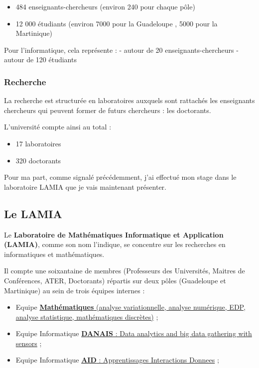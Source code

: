 \begin{itemize}
\tightlist
\item
  484 enseignants-chercheurs (environ 240 pour chaque pôle)
\item
  12 000 étudiants (environ 7000 pour la Guadeloupe , 5000 pour la
  Martinique)
\end{itemize}

Pour l'informatique, cela représente : - autour de 20
enseignants-chercheurs - autour de 120 étudiants

\hypertarget{recherche}{%
\subsubsection{Recherche}\label{recherche}}

La recherche est structurée en laboratoires auxquels sont rattachés les
enseignants chercheurs qui peuvent former de futurs chercheurs : les
doctorants.

L'université compte ainsi au total :

\begin{itemize}
\tightlist
\item
  17 laboratoires
\item
  320 doctorants
\end{itemize}

Pour ma part, comme signalé précédemment, j'ai effectué mon stage dans
le laboratoire LAMIA que je vais maintenant présenter.

\hypertarget{le-lamia}{%
\subsection{Le LAMIA}\label{le-lamia}}

Le \textbf{Laboratoire de Mathématiques Informatique et Application
(LAMIA)}, comme son nom l'indique, se concentre sur les recherches en
informatiques et mathématiques.

Il compte une soixantaine de membres (Professeurs des Universités,
Maitres de Conférences, ATER, Doctorants) répartis sur deux pôles
(Guadeloupe et Martinique) au sein de trois équipes internes :

\begin{itemize}
\tightlist
\item
  Equipe
  \href{http://lamia.univ-ag.fr/index.php?page=equipe-mathematiques}{\textbf{Mathématiques}
  (analyse variationnelle, analyse numérique, EDP, analyse statistique,
  mathématiques discrètes)} ;
\item
  Equipe Informatique
  \href{http://lamia.univ-ag.fr/index.php?page=equipe-danais}{\textbf{DANAIS}
  : Data analytics and big data gathering with sensors} ;
\item
  Equipe Informatique
  \href{http://lamia.univ-ag.fr/index.php?page=equipe-aid}{\textbf{AID}
  : Apprentissages Interactions Donnees} ;
\end{itemize}

